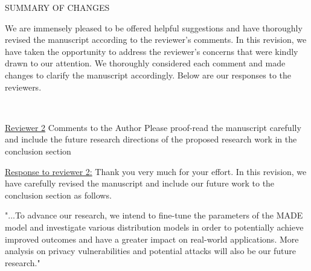 \fontsize{12}{21}\selectfont
\onecolumn




\centerline{SUMMARY OF CHANGES}


We are immensely pleased to be offered helpful suggestions and have thoroughly revised the manuscript according to the reviewer’s comments. In this revision, we have taken the opportunity to address the reviewer’s concerns that were kindly drawn to our attention. We thoroughly considered each comment and made changes to clarify the manuscript accordingly. Below are our responses to the reviewers.

~~~~

\underline{Reviewer 2}
Comments to the Author
Please proof-read the manuscript carefully and include the future research directions of the proposed research work in the conclusion section

\underline{Response to reviewer 2:}
Thank you very much for your effort. In this revision, we have carefully revised the manuscript and include our future work to the conclusion section as follows.

"...To advance our research, we intend to fine-tune the parameters of the MADE model and investigate various distribution models in order to potentially achieve improved outcomes and have a greater impact on real-world applications. More analysis on privacy vulnerabilities and potential attacks will also be our future research."